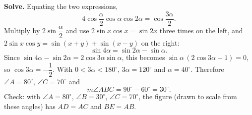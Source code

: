 \textbf{Solve.} Equating the two expressions,
\[
4\cos\dfrac{\alpha}{2}\cos\alpha\cos2\alpha=\cos\dfrac{3\alpha}{2}.
\]
Multiply by $2\sin\dfrac{\alpha}{2}$ and use $2\sin x\cos x=\sin2x$ three times on the left, and $2\sin x\cos y=\sin(x+y)+\sin(x-y)$ on the right:
\[
\sin4\alpha=\sin2\alpha-\sin\alpha .
\]
Since $\sin4\alpha-\sin2\alpha=2\cos3\alpha\sin\alpha$, this becomes $\sin\alpha\,(2\cos3\alpha+1)=0$, so $\cos3\alpha=-\dfrac{1}{2}$. With $0<3\alpha<180^\circ$, $3\alpha=120^\circ$ and $\alpha=40^\circ$. Therefore $\angle A=80^\circ$, $\angle C=70^\circ$ and
\[
m\angle ABC=90^\circ-60^\circ=\boxed{30^\circ}.
\]
Check: with $\angle A=80^\circ$, $\angle B=30^\circ$, $\angle C=70^\circ$, the figure (drawn to scale from these angles) has $AD=AC$ and $BE=AB$.
